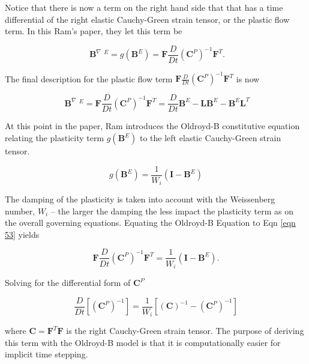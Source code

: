 \documentclass[a4paper]{article}
\begin{document}
Notice that there is now a term on the right hand side that that has a time differential of the right elastic Cauchy-Green strain tensor, or the plastic flow term. In this Ram's paper, they let this term be 

\begin{equation}\label{eqn 53}
    \mathop{\mathbf{B}}^\nabla\limits{}^{E} = g(\mathbf{B}^E) = \mathbf{F} \frac{D}{Dt}(\mathbf{C}^P)^{-1} \mathbf{F}^T. 
\end{equation}

The final description for the plastic flow term $\mathbf{F} \frac{D}{Dt}(\mathbf{C}^P)^{-1} \mathbf{F}^T$ is now

\begin{equation}
    \mathop{\mathbf{B}}^\nabla\limits{}^{E} = \mathbf{F} \frac{D}{Dt}(\mathbf{C}^P)^{-1} \mathbf{F}^T = \frac{D}{Dt} \mathbf{B}^E - \mathbf{L}\mathbf{B}^E - \mathbf{B}^E \mathbf{L}^T 
\end{equation}

At this point in the paper, Ram introduces the Oldroyd-B constitutive equation relating the plasticity term $g(\mathbf{B}^E)$ to the left elastic Cauchy-Green strain tensor. 

\begin{equation}
    g(\mathbf{B}^E) = \frac{1}{W_i}(\mathbf{I} - \mathbf{B}^E)
\end{equation}

The damping of the plasticity is taken into account with the Weissenberg number, $W_i$ -- the larger the damping the less impact the plasticity term as on the overall governing equations. Equating the Oldroyd-B Equation to Eqn \ref{eqn 53} yields 

\begin{equation}
    \mathbf{F} \frac{D}{Dt}(\mathbf{C}^P)^{-1} \mathbf{F}^T = \frac{1}{W_i}(\mathbf{I} - \mathbf{B}^E). 
\end{equation}

Solving for the differential form of $\mathbf{C}^P$ 

\begin{equation}
    \frac{D}{Dt} [(\mathbf{C}^P)^{-1}] = \frac{1}{W_i}[(\mathbf{C})^{-1} - (\mathbf{C}^P)^{-1}]
\end{equation}

where $\mathbf{C} = \mathbf{F}^T \mathbf{F}$ is the right Cauchy-Green strain tensor. The purpose of deriving this term with the Oldroyd-B model is that it is computationally easier for implicit time stepping.
\end{document}
